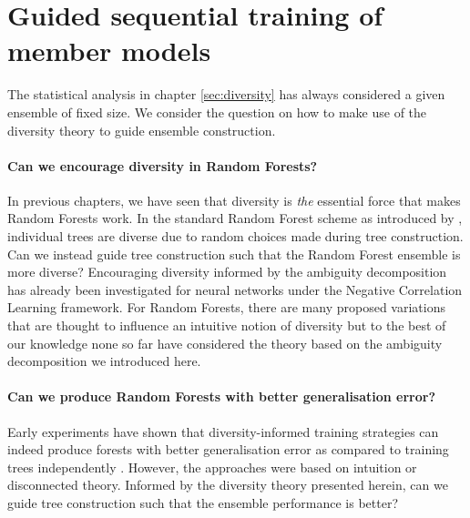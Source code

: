 \documentclass[
	twoside=false, %
]{kaobook}
\begin{document}



\section{Guided sequential training of member models}
\label{sec:dynamic-random-forests}

The statistical analysis in chapter \ref{sec:diversity} has always considered a given ensemble of fixed size. 
We consider the question on how to make use of the diversity theory to guide ensemble construction.

\paragraph{Can we encourage diversity in Random Forests?} 
In previous chapters, we have seen that diversity is \textit{the} essential force that makes Random Forests work. In the standard Random Forest scheme as introduced by \citeauthor{breiman_RandomForests_2001}, individual trees are diverse due to random choices made during tree construction. Can we instead guide tree construction such that the Random Forest ensemble is more diverse?
Encouraging diversity informed by the ambiguity decomposition has already been investigated for neural networks under the Negative Correlation Learning framework. For Random Forests, there are many proposed variations that are thought to influence an intuitive notion of diversity but to the best of our knowledge none so far have considered the theory based on the ambiguity decomposition we introduced here.


\paragraph{Can we produce Random Forests with better generalisation error?}
Early experiments have shown that diversity-informed training strategies can indeed produce forests with better generalisation error as compared to training trees independently
\cite{bernard_DynamicRandomForests_2012,bernard_SelectionDecisionTrees_2009,buschjager_GeneralizedNegativeCorrelation_2020}. However, the approaches were based on intuition or disconnected theory. Informed by the diversity theory presented herein, can we guide tree construction such that the ensemble performance is better?
\end{document}
